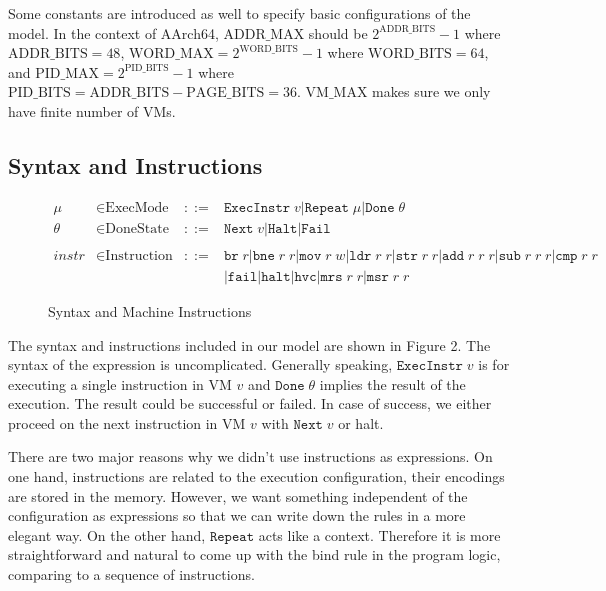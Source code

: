 \documentclass[a4paper]{article}
\newcommand*{\derived}{::=}
\newcommand*{\MODE}{\text{ExecMode}}
\newcommand*{\DONE}{\text{DoneState}}
\newcommand*{\INSTR}{\text{Instruction}}
\newcommand*{\PABITS}{\text{ADDR\_BITS}}
\newcommand*{\PPBITS}{\text{PAGE\_BITS}}
\newcommand*{\PPIDBITS}{\text{PID\_BITS}}
\newcommand*{\PAMAX}{\text{ADDR\_MAX}}
\newcommand*{\PPIDMAX}{\text{PID\_MAX}}
\newcommand*{\PWBITS}{\text{WORD\_BITS}}
\newcommand*{\PWMAX}{\text{WORD\_MAX}}
\newcommand*{\PVMMAX}{\text{VM\_MAX}}
\newcommand*{\instrm}[1]{\mathtt{#1}}
\newcommand*{\EI}[1]{\mathtt{ExecInstr} \; {#1}}
\newcommand*{\DN}[1]{\mathtt{Done} \; {#1}}
\newcommand*{\NXT}[1]{\mathtt{Next} \; {#1}}
\begin{document}
Some constants are introduced as well to specify basic configurations of the model. In
the context of AArch64, $\PAMAX$ should be $2^{\PABITS} - 1$ where
$\PABITS = 48$, $\PWMAX = 2^{\PWBITS} -1$ where $\PWBITS = 64$, and
$\PPIDMAX = 2^{\PPIDBITS}-1$ where $\PPIDBITS = \PABITS - \PPBITS = 36$.
$\PVMMAX$ makes sure we only have finite number of VMs.


\subsection{Syntax and Instructions}
\begin{figure}[h!]
  \begin{align*}
    \mu &\in \MODE &\derived & \mathtt{ExecInstr} \; v | \mathtt{Repeat} \; \mu | \mathtt{Done} \; \theta \\
    \theta &\in \DONE &\derived & \NXT{v} | \mathtt{Halt} | \mathtt{Fail}\\
    \\
    instr & \in  \INSTR &\derived & \instrm{br} \; r |\instrm{bne} \; r \; r |
                                    \instrm{mov} \; r \; w | \instrm{ldr} \; r\; r|
                                    \instrm{str} \; r \; r | \instrm{add} \; r \; r \; r |
                                    \instrm{sub} \; r \; r \; r | \instrm{cmp} \; r \; r \\
        & & & | \instrm{fail} | \instrm{halt} | \instrm{hvc} |\instrm{mrs} \; r\;r | \instrm{msr} \; r \; r
  \end{align*}
  \caption{Syntax and Machine Instructions}
\end{figure}
The syntax and instructions included in our model are shown in Figure 2. The
syntax of the expression is uncomplicated. Generally speaking, $\EI{v}$ is for
executing a single instruction in VM $v$ and $\DN{\theta}$ implies the result of
the execution. The result could be successful or failed. In case of success, we
either proceed on the next instruction in VM $v$ with $\NXT{v}$ or halt.

There are two major reasons why we didn't use instructions as expressions. On
one hand,
instructions are related to the execution configuration, their encodings are
stored in the memory. However, we want something independent of the
configuration as expressions so that we can write down the rules in a more
elegant way. On the other hand, $\mathtt{Repeat}$ acts like a context.
Therefore it is more straightforward and natural to come up with the bind rule
in the program logic, comparing to a sequence of instructions.
\end{document}
